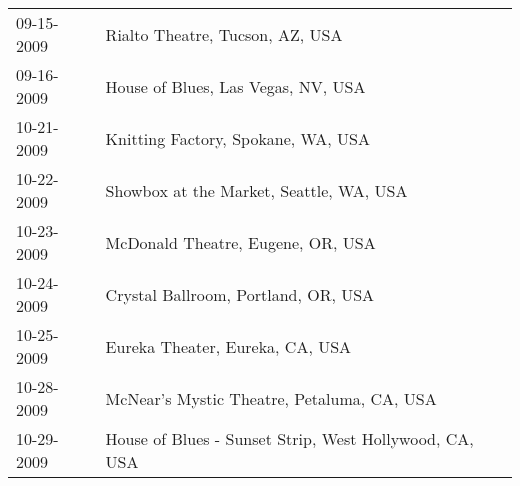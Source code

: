 \begin{supertabular}{ll}
 09-15-2009 &                         Rialto Theatre, Tucson, AZ, USA \\
 09-16-2009 &                      House of Blues, Las Vegas, NV, USA \\
 10-21-2009 &                      Knitting Factory, Spokane, WA, USA \\
 10-22-2009 &                 Showbox at the Market, Seattle, WA, USA \\
 10-23-2009 &                       McDonald Theatre, Eugene, OR, USA \\
 10-24-2009 &                     Crystal Ballroom, Portland, OR, USA \\
 10-25-2009 &                         Eureka Theater, Eureka, CA, USA \\
 10-28-2009 &              McNear's Mystic Theatre, Petaluma, CA, USA \\
 10-29-2009 &  House of Blues - Sunset Strip, West Hollywood, CA, USA \\
\end{supertabular}
